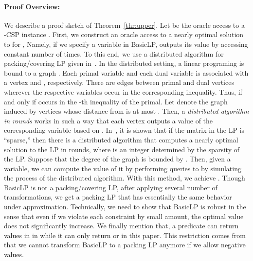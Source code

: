 \documentclass[letterpaper, 11pt]{article}
\newcommand{\blp}{\textsf{BasicLP}\xspace}
\begin{document}
\paragraph{Proof Overview:}
We describe a proof sketch of Theorem~\ref{thr:upper}.
Let  be the oracle access to a -CSP instance .
First, 
we construct an oracle access  to a nearly optimal solution to  for ,
Namely, 
if we specify a variable in \blp, 
 outputs its value by accessing  constant number of times.
To this end, we use a distributed algorithm for packing/covering LP given in~\cite{KMW06}.
In the distributed setting,
a linear programing is bound to a graph .
Each primal variable  and each dual variable  is associated with a vertex  and , respectively. 
There are edges between primal and dual vertices wherever the respective variables occur in the corresponding inequality.
Thus,  if and only if  occurs in the -th inequality of the primal.
Let  denote the graph induced by vertices whose distance from  is at most .
Then, a \textit{distributed algorithm in  rounds} works in such a way that each vertex outputs a value of the corresponding variable based on .
In~\cite{KMW06},
it is shown that if the matrix in the LP is ``sparse,''
then there is a distributed algorithm that computes a nearly optimal solution to the LP in  rounds,
where  is an integer determined by the sparsity of the LP.
Suppose that the degree of the graph is bounded by .
Then, given a variable,
we can compute the value of it by performing  queries to  by simulating the process of the distributed algorithm.
With this method, we achieve .
Though \blp is not a packing/covering LP,
after applying several number of transformations,
we get a packing LP that has essentially the same behavior under approximation.
Technically, we need to show that \blp is robust in the sense that
even if we violate each constraint by small amount,
the optimal value does not significantly increase.
We finally mention that, a predicate can return values in  in \cite{Rag08} while it can only return  or  in this paper.
This restriction comes from that we cannot transform \blp to a packing LP anymore if we allow negative values.
\end{document}
